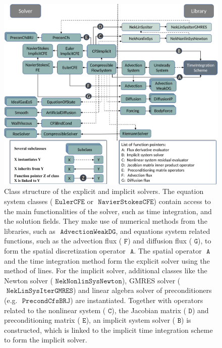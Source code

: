   \begin{figure}[htbp!]
    \begin{centering}
        \includegraphics[width=1\textwidth]{./img/DataStructureFinal}
        \par\end{centering}
    \centering{}\caption{Class structure of the explicit and implicit solvers. The equation system classes ($\texttt{ EulerCFE}$ or $\texttt{ NavierStokesCFE}$) contain access to the main functionalities of the solver, such as time integration, and the solution fields. They make use of numerical methods from the libraries, such as $\texttt{ AdvectionWeakDG}$, and equations system related functions, such as the advection flux ($\texttt{ F}$) and diffusion flux ($\texttt{ G}$), to form the spatial discretization operator $\texttt{ A}$. The spatial operator $\texttt{ A}$ and the time integration method form the explicit solver using the method of lines. For the implicit solver, additional classes like the Newton solver ($\texttt{ NekNonlinSysNewton}$), GMRES solver ($\texttt{ NekLinSysIterGMRES}$) and linear algebra solver of preconditioners (e.g. $\texttt{ PrecondCfsBRJ}$) are instantiated. Together with operators related to the nonlinear system ($\texttt{ C}$), the Jacobian matrix ($\texttt{ D}$) and preconditioning matrix ($\texttt{ E}$), an implicit system solver ($\texttt{ B}$) is constructed, which is linked to the implicit time integration scheme to form the implicit solver.} \label{fig:Class-structure-of}
  \end{figure}
  

